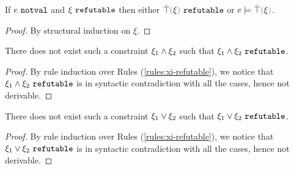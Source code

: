 \begin{lemma}
\label{lem:notval-refutable}
If $e ~\mathtt{notval}$ and $\xi ~\mathtt{refutable}$ then either $\refutable{\ctruify{\xi}}$ or $\csatisfy{e}{\ctruify{\xi}}$.
\end{lemma}
\begin{proof}
  By structural induction on $\xi$.
\end{proof}

\begin{lemma}
\label{lem:no-and-refutable}
There does not exist such a constraint $\xi_1 \wedge \xi_2$ such that $\xi_1 \wedge \xi_2 ~\mathtt{refutable}$.
\end{lemma}
\begin{proof}
By rule induction over Rules (\ref{rules:xi-refutable}), we notice that $\xi_1 \wedge \xi_2 ~\mathtt{refutable}$ is in syntactic contradiction with all the cases, hence not derivable.
\end{proof}

\begin{lemma}
\label{lem:no-or-refutable}
There does not exist such a constraint $\xi_1 \vee \xi_2$ such that $\xi_1 \vee \xi_2 ~\mathtt{refutable}$.
\end{lemma}
\begin{proof}
By rule induction over Rules (\ref{rules:xi-refutable}), we notice that $\xi_1 \vee \xi_2 ~\mathtt{refutable}$ is in syntactic contradiction with all the cases, hence not derivable.
\end{proof}

